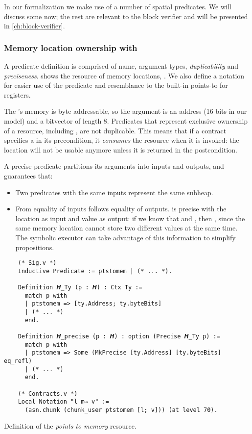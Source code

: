 In our formalization we make use of a number of spatial predicates. We will discuss some now; the rest are relevant to the block verifier and will be presented in \cref{ch:block-verifier}.

\subsubsection{Memory location ownership with }

A predicate definition is comprised of name, argument types, \emph{duplicability} and \emph{preciseness}.  shows the resource of memory locations, . We also define a notation  for easier use of the predicate and resemblance to the built-in points-to for registers.

The \msp's memory is byte addressable, so the argument  is an address (16 bits in our model) and  a bitvector of length 8. Predicates that represent exclusive ownership of a resource, including , are not duplicable. This means that if a contract specifies a  in its precondition, it \emph{consumes} the resource when it is invoked: the location will not be usable anymore unless it is returned in the postcondition.

A precise predicate partitions its arguments into inputs and outputs, and guarantees that:
\begin{itemize}
\item Two predicates with the same inputs represent the same subheap.
\item From equality of inputs follows equality of outputs.  is precise with the location as input and value as output: if we know that  and , then , since the same memory location cannot store two different values at the same time. The symbolic executor can take advantage of this information to simplify propositions.
\end{itemize}

\begin{listing}[htb]
  \begin{verbatim}
    (* Sig.v *)
    Inductive Predicate := ptstomem | (* ... *).

    Definition 𝑯_Ty (p : 𝑯) : Ctx Ty :=
      match p with
      | ptstomem => [ty.Address; ty.byteBits]
      | (* ... *)
      end.

    Definition 𝑯_precise (p : 𝑯) : option (Precise 𝑯_Ty p) :=
      match p with
      | ptstomem => Some (MkPrecise [ty.Address] [ty.byteBits] eq_refl)
      | (* ... *)
      end.

    (* Contracts.v *)
    Local Notation "l m↦ v" :=
      (asn.chunk (chunk_user ptstomem [l; v])) (at level 70).
  \end{verbatim}
  \caption{Definition of the \emph{points to memory} resource.}
  \label{lst:ptstomem}
\end{listing}


